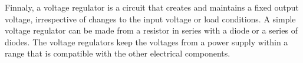 Finnaly, a voltage regulator is a circuit that creates and maintains a fixed output voltage, irrespective of changes to the input voltage or load conditions. A simple voltage regulator can be made from a resistor in series with a diode or a series of diodes. The voltage regulators keep the voltages from a power supply within a range that is compatible with the other electrical components.
